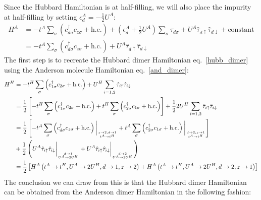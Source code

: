 \documentclass[12pt]{article}
\numberwithin{equation}{section}
\begin{document}
Since the Hubbard Hamiltonian is at half-filling, we will also place the impurity at half-filling by setting \(\epsilon_d^A = -\frac{1}{2}U^A\):
\begin{equation}\begin{aligned}
	\label{and_dimer}
	H^A &= -t^A\sum_{\sigma}\left(c^\dagger_{d\sigma}c_{z\sigma} + \text{h.c.}\right) + \left(\epsilon_d^A + \frac{1}{2}U^A\right) \sum_{\sigma}\hat \tau_{d\sigma} + U^A\hat \tau_{d \uparrow}\hat \tau_{d \downarrow} + \text{constant}\\
	    &= -t^A\sum_{\sigma}\left(c^\dagger_{d\sigma}c_{z\sigma} + \text{h.c.}\right) + U^A\hat \tau_{d \uparrow}\hat \tau_{d \downarrow}
\end{aligned}\end{equation}
The first step is to recreate the Hubbard dimer Hamiltonian eq.~\ref{hubb_dimer} using the Anderson molecule Hamiltonian eq.~\ref{and_dimer}:
\begin{equation}\begin{aligned}
	H^H &= -t^H\sum_{\sigma}\left(c^\dagger_{1\sigma}c_{2\sigma} + \text{h.c.}\right) + U^H\sum_{i=1,2}\hat \tau_{i \uparrow}\hat \tau_{i \downarrow}\\
	    &= \frac{1}{2}\left[-t^H\sum_{\sigma}\left(c^\dagger_{1\sigma}c_{2\sigma} + \text{h.c.}\right) + t^H\sum_{\sigma}\left(c^\dagger_{2\sigma}c_{1\sigma} + \text{h.c.}\right)\right] + \frac{1}{2} 2U^H\sum_{i=1,2}\hat \tau_{i \uparrow}\hat \tau_{i \downarrow}\\
	    &= \frac{1}{2}\left[-t^A\sum_{\sigma}\left(c^\dagger_{d\sigma}c_{z\sigma} + \text{h.c.}\right)\bigg\vert_{z \to 2, d \to 1\atop{t^A \to t^H}} + t^A\sum_{\sigma}\left(c^\dagger_{2\sigma}c_{1\sigma} + \text{h.c.}\right)\bigg\vert_{d \to 2,z \to 1\atop{t^A \to t^H}} \right] \\
	    &+ \frac{1}{2} \left(U^A\hat \tau_{i \uparrow}\hat \tau_{i \downarrow}\bigg\vert_{d \to 1\atop{U^A \to 2U^H}} + U^A\hat \tau_{i \uparrow}\hat \tau_{i \downarrow}\bigg\vert_{d \to 2\atop{U^A \to 2U^H}}\right)\\
	    &=\frac{1}{2}\left[H^A\left(t^A \to t^H, U^A \to 2U^H, d \to 1, z \to 2\right) + H^A\left(t^A \to t^H, U^A \to 2U^H, d \to 2, z \to 1\right)\right]
\end{aligned}\end{equation}
The conclusion we can draw from this is that the Hubbard dimer Hamiltonian can be obtained from the Anderson dimer Hamiltonian in the following fashion:
\end{document}
